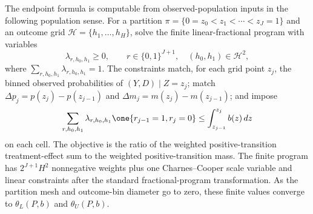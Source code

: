 The endpoint formula is computable from observed-population inputs in the
following population sense.  For a partition
\(\pi=\{0=z_0<z_1<\cdots<z_J=1\}\) and an outcome grid
\(\mathcal H=\{h_1,\ldots,h_H\}\), solve the finite linear-fractional program
with variables
\[
\lambda_{r,h_0,h_1}\ge0,
\qquad
r\in\{0,1\}^{J+1},\quad (h_0,h_1)\in\mathcal H^2,
\]
where \(\sum_{r,h_0,h_1}\lambda_{r,h_0,h_1}=1\).  The constraints match, for
each grid point \(z_j\), the binned observed probabilities of
\((Y,D)\mid Z=z_j\); match \(\Delta p_j=p(z_j)-p(z_{j-1})\) and
\(\Delta m_j=m(z_j)-m(z_{j-1})\); and impose
\[
\sum_{r,h_0,h_1}\lambda_{r,h_0,h_1}
\one\{r_{j-1}=1,r_j=0\}
\le \int_{z_{j-1}}^{z_j}b(z)\,dz
\]
on each cell.  The objective is the ratio of the weighted positive-transition
treatment-effect sum to the weighted positive-transition mass.  The finite
program has \(2^{J+1}H^2\) nonnegative weights plus one Charnes--Cooper scale
variable and linear constraints after the standard fractional-program
transformation.  As the partition mesh and outcome-bin diameter go to zero,
these finite values converge to \(\theta_L(P,b)\) and \(\theta_U(P,b)\).

